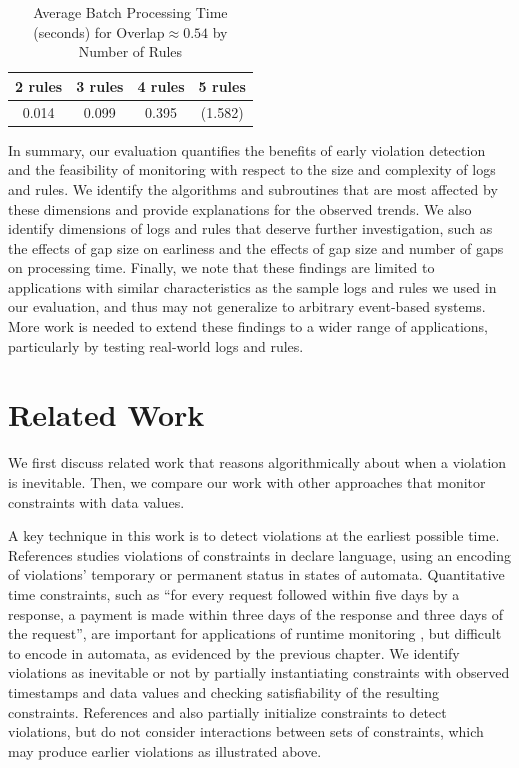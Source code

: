 \begin{table}[htbp]
  \centering
\begin{tabular}{|c|c|c|c|}
\hline
\textbf{2 rules} & \textbf{3 rules} & \textbf{4 rules} & \textbf{5 rules} \\\hline\hline
0.014                  & 0.099      & 0.395            & (1.582)            \\\hline
\end{tabular}
\caption{Average Batch Processing Time (seconds) for Overlap${\approx}0.54$ by Number of Rules}
\label{tab:number-rules-experiment}
\end{table}

In summary, our evaluation
quantifies
the benefits of early violation detection
and the feasibility of monitoring
with respect to the size and complexity of logs and rules.
We identify the algorithms and subroutines 
that are most affected by these dimensions
and provide explanations for the observed trends.
We also identify dimensions of logs and rules
that deserve further investigation,
such as the effects of gap size on earliness
and the effects of gap size and number of gaps on processing time.
Finally,
we note that these findings are limited 
to applications with similar characteristics as the sample logs
and rules we used in our evaluation,
and thus may not generalize to arbitrary event-based systems.
More work is needed to extend these findings to a wider range of applications,
particularly by testing real-world logs and rules.

\section{Related Work}
\label{sec:early-violation-detection-related-work}

We first discuss related work that reasons algorithmically
about when a violation is inevitable.
Then, we compare our work with other approaches
that monitor constraints with data values.

A key technique in this work
is to detect violations at the earliest possible time.
References \cite{maggi2011monitoringcolored,maggi2012runtime,
maggi2011runtime} studies violations
of constraints in {\sc declare} language,
using
an encoding of violations' temporary or permanent status in states of automata.
Quantitative time constraints,
such as ``for every request followed within five days by a response,
a payment is made within three days of the response and three days of the request'',
are important
for applications of runtime monitoring \cite{ly2015compliance},
but difficult to encode in automata,
as evidenced by the previous chapter.
We identify violations
as inevitable or not
by partially instantiating constraints
with observed timestamps and data values
and checking satisfiability of the resulting constraints.
References \cite{dousson2007chronicle} and \cite{maggi2019compliance}
also partially initialize
constraints to detect violations,
but do not consider interactions between sets of constraints,
which may produce earlier violations as illustrated above.

